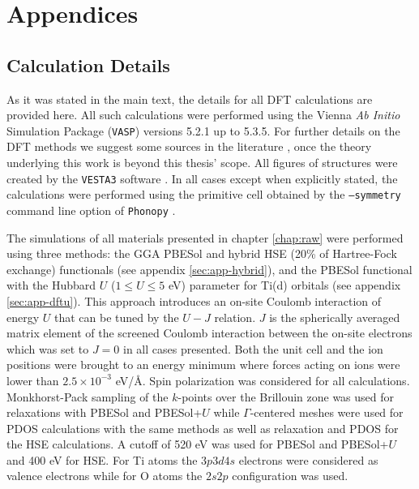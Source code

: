 \appendix

\chapter{Appendices}

\section{Calculation Details}
\label{sec:app-calc}

As it was stated in the main text, the details for all DFT calculations are provided here. All such calculations were performed using the Vienna \textit{Ab Initio} Simulation Package (\texttt{VASP}) \cite{Kresse1996a,Kresse1996b,Kresse1999,Kresse1993} versions 5.2.1 up to 5.3.5. For further details on the DFT methods we suggest some sources in the literature \cite{FazzioCanutoVianna,Hohenberg_Kohn_64,Thomas,YangParr,Kohn_Sham_65,Fermi_28,Bloch_29,Kresse1996a,Kresse1996b,Capelle2006,Zangwill2014,Jensen,Ihm1979,Blochl1994,Kresse1999,Kresse1993}, once the theory underlying this work is beyond this thesis' scope. All figures of structures were created by the \texttt{VESTA3} software \cite{Momma2011}. In all cases except when explicitly stated, the calculations were performed using the primitive cell obtained by the \texttt{--symmetry} command line option of \texttt{Phonopy} \cite{phonopy}.

The simulations of all materials presented in chapter \ref{chap:raw} were performed using three methods: the GGA PBESol \cite{Perdew2008} and hybrid HSE (20\% of Hartree-Fock exchange)\cite{Heyd2003} functionals (see appendix \ref{sec:app-hybrid}), and the PBESol functional with the Hubbard $U$ ($ 1 \leq U \leq 5$ eV) parameter \cite{Dudarev1998} for Ti(d) orbitals (see appendix \ref{sec:app-dftu}). This approach introduces an on-site Coulomb interaction of energy $U$ that can be tuned by the $U-J$ relation. $J$ is the spherically averaged matrix element of the screened Coulomb interaction between the on-site electrons which was set to $J=0$ in all cases presented. Both the unit cell and the ion positions were brought to an energy minimum where forces acting on ions were lower than $2.5 \times 10^{-3}$ eV/\AA. Spin polarization was considered for all calculations. Monkhorst-Pack sampling \cite{Monkhorst1976} of the $k$-points over the Brillouin zone was used for relaxations with PBESol and PBESol+$U$ while $\Gamma$-centered meshes were used for PDOS calculations with the same methods as well as relaxation and PDOS for the HSE calculations. A cutoff of 520 eV was used for PBESol and PBESol+$U$ and 400 eV for HSE. For Ti atoms the $3p3d4s$ electrons were considered as valence electrons while for O atoms the $2s2p$ configuration was used.


